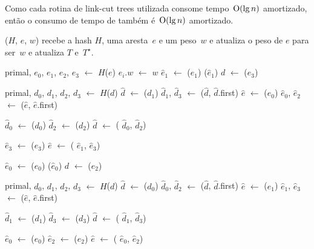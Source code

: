 Como cada rotina de link-cut trees utilizada consome tempo~$\mathrm{O}(\lg n)$ amortizado, então o consumo de tempo de \MSFupdate{} também é~$\mathrm{O}(\lg n)$ amortizado.



\newpage
\MSFupdate($H$, $e$, $w$) recebe a hash $H$, uma aresta~$e$ e um peso~$w$ e atualiza o peso de $e$ para ser~$w$ e atualiza $T$ e~$T^\star$.

\begin{algorithm}[htb]
\caption{\MSFupdate($H$, $e$, $w$)}
\label{Algo:MSFupdate}
\begin{algorithmic}[1]
\State primal, $e_0$, $e_1$, $e_2$, $e_3$ $\gets$ $H$($e$)
\State $e_i.w$ $\gets$ $w$
\EndFor
{}\label{Algo:MSFupdate:linhauvinF}
\State $\hat e_1$ $\gets$ \LCOFindNode($e_1$)
\State \LCOEvert($\hat e_1$)
\State $d$ $\gets$ \LCOMin($e_3$)

\State primal, $d_0$, $d_1$, $d_2$, $d_3$ $\gets$ $H$($d$)
\State $\hat d$ $\gets$ \LCOFindNode($d_1$)
\State $\hat d_1$, $\hat d_3$ $\gets$ \LCOSplit($\hat d$, $\hat d$.first)
\State $\hat e$ $\gets$ \LCOFindNode($e_0$)
\State $\hat e_0$, $\hat e_2$ $\gets$ \LCOSplit($\hat e$, $\hat e$.first)


\State $\hat d_0$ $\gets$ \LCOFindNode($d_0$)
\State $\hat d_2$ $\gets$ \LCOFindNode($d_2$)
\State $\hat d$ $\gets$ \LCOMerge( $\hat d_0$, $\hat d_2$)

\State $\hat e_3$ $\gets$ \LCOFindNode($e_3$)
\State $\hat e$ $\gets$ \LCOMerge( $\hat e_1$, $\hat e_3$)

\EndIf

\Else

\State $\hat e_0$ $\gets$ \LCOFindNode($e_0$)
\State \LCOEvert($\hat e_0$)
\State $d$ $\gets$ \LCOMax($e_2$)

\State primal, $d_0$, $d_1$, $d_2$, $d_3$ $\gets$ $H$($d$)
\State $\hat d$ $\gets$ \LCOFindNode($d_0$)
\State $\hat d_0$, $\hat d_2$ $\gets$ \LCOSplit($\hat d$, $\hat d$.first)
\State $\hat e$ $\gets$ \LCOFindNode($e_1$)
\State $\hat e_1$, $\hat e_3$ $\gets$ \LCOSplit($\hat e$, $\hat e$.first)


\State $\hat d_1$ $\gets$ \LCOFindNode($d_1$)
\State $\hat d_3$ $\gets$ \LCOFindNode($d_3$)
\State $\hat d$ $\gets$ \LCOMerge( $\hat d_1$, $\hat d_3$)

\State $\hat e_0$ $\gets$ \LCOFindNode($e_0$)
\State $\hat e_2$ $\gets$ \LCOFindNode($e_2$)
\State $\hat e$ $\gets$ \LCOMerge( $\hat e_0$, $\hat e_2$)




\EndIf
\EndIf
\end{algorithmic}
\end{algorithm}

